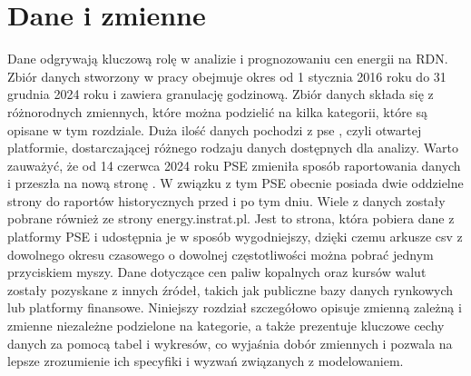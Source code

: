 \chapter{Dane i zmienne}
\label{ch:dane}

Dane odgrywają kluczową rolę w analizie i prognozowaniu cen energii na RDN. Zbiór danych stworzony w pracy obejmuje okres od 1 stycznia 2016 roku do 31 grudnia 2024 roku i zawiera granulację godzinową. Zbiór danych składa się z różnorodnych zmiennych, które można podzielić na kilka kategorii, które są opisane w tym rozdziale. Duża ilość danych pochodzi z \gls{pse} \cite{PSEOLD}, czyli otwartej platformie, dostarczającej różnego rodzaju danych dostępnych dla analizy. Warto zauważyć, że od 14 czerwca 2024 roku PSE zmieniła sposób raportowania danych i przeszła na nową stronę \cite{PSENEW}. W związku z tym PSE obecnie posiada dwie oddzielne strony do raportów historycznych przed i po tym dniu. Wiele z danych zostały pobrane również ze strony energy.instrat.pl. Jest to strona, która pobiera dane z platformy PSE i udostępnia je w sposób wygodniejszy, dzięki czemu arkusze csv z dowolnego okresu czasowego o dowolnej częstotliwości można pobrać jednym przyciskiem myszy. Dane dotyczące cen paliw kopalnych oraz kursów walut zostały pozyskane z innych źródeł, takich jak publiczne bazy danych rynkowych lub platformy finansowe. Niniejszy rozdział szczegółowo opisuje zmienną zależną i zmienne niezależne podzielone na kategorie, a także prezentuje kluczowe cechy danych za pomocą tabel i wykresów, co wyjaśnia dobór zmiennych i pozwala na lepsze zrozumienie ich specyfiki i wyzwań związanych z modelowaniem.

